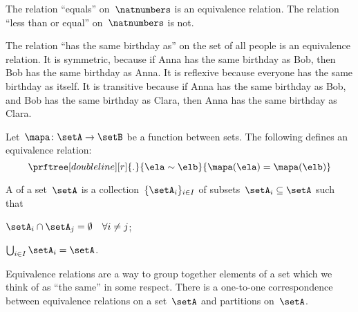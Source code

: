 \begin{example}
    The relation ``equals'' on~$\natnumbers$ is an equivalence relation.
    The relation ``less than or equal'' on~$\natnumbers$ is not.
\end{example}

\begin{example}
    The relation ``has the same birthday as'' on the set of all people is an equivalence relation.
    It is symmetric, because if Anna has the same birthday as Bob, then Bob has the same birthday as Anna.
    It is reflexive because everyone has the same birthday as itself.
    It is transitive because if Anna has the same birthday as Bob, and Bob has the same birthday as Clara, then Anna has the same birthday as Clara.
\end{example}

\begin{example}
    Let~$\mapa\colon \setA\to \setB$ be a function between sets.
    The following defines an equivalence relation:
    \begin{equation*}
        \prftree[double line][r]{.}{\ela\sim \elb}{\mapa(\ela)=\mapa(\elb)}
    \end{equation*}
\end{example}

\begin{ctdefinition}[Partition]
    \label{def:partition}
    A \emph{} of a set~$\setA$ is a collection~$\{\setA_i\}_{i\in I}$ of subsets~$\setA_i\subseteq \setA$ such that
    \begin{compactenum}
        \item $\setA_i\cap \setA_j=\emptyset \quad \forall i\neq j$;
        \item $\bigcup_{i\in I}\setA_i=\setA$.
    \end{compactenum}
\end{ctdefinition}

\begin{remark}
    Equivalence relations are a way to group together elements of a set which we think of as ``the same'' in some respect.
    There is a one-to-one correspondence between equivalence relations on a set~$\setA$ and partitions on~$\setA$.
\end{remark}


\begin{marginfigure}
    \centering
    \caption{
        \label{fig:info_network}
    }
\end{marginfigure}

